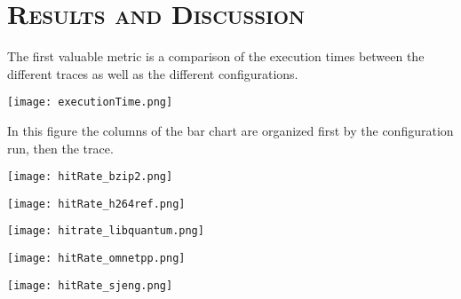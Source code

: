 \documentclass[cacheSimReport.tex]{subfiles}
\begin{document}
\section*{\textsc{\Large Results and Discussion}}

The first valuable metric is a comparison of the execution times between the different traces as well as the different configurations.

\smallskip

\hspace{-.9cm}\texttt{[image: executionTime.png]}

\smallskip

In this figure the columns of the bar chart are organized first by the configuration run, then the trace.

\hspace{-.9cm}\texttt{[image: hitRate\_bzip2.png]}

\hspace{-.9cm}\texttt{[image: hitRate\_h264ref.png]}

\hspace{-.9cm}\texttt{[image: hitrate\_libquantum.png]}

\hspace{-.9cm}\texttt{[image: hitRate\_omnetpp.png]}

\hspace{-.9cm}\texttt{[image: hitRate\_sjeng.png]}
\end{document}
